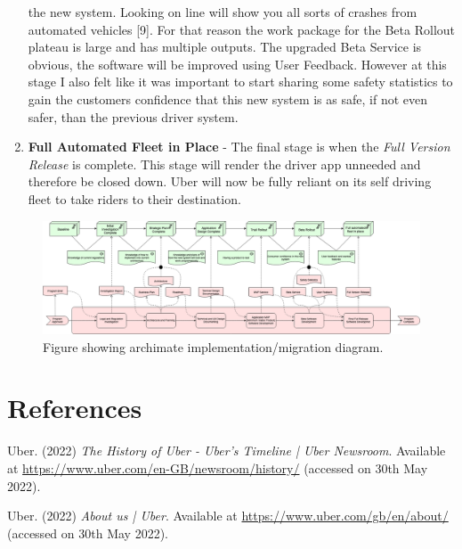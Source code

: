\documentclass{article}
\begin{document}
\begin{enumerate}
            the new system. Looking on line will show you all sorts of crashes from automated vehicles [9]. For that reason the work package for the Beta Rollout
            plateau is large and has multiple outputs. The upgraded Beta Service is obvious, the software will be improved using User Feedback. However at this 
            stage I also felt like it was important to start sharing some safety statistics to gain the customers confidence that this new system is as safe, if 
            not even safer, than the previous driver system.
      \item \textbf{Full Automated Fleet in Place} - The final stage is when the \textit{Full Version Release} is complete. This stage will render the driver app
            unneeded and therefore be closed down. Uber will now be fully reliant on its self driving fleet to take riders to their destination.
    \end{enumerate}

    \newpage

    \begin{landscape}
      \begin{figure}
        \centering
        \includegraphics[width=20cm]{assets/migration.drawio.png}
        \caption{Figure showing archimate implementation/migration diagram.}
        \label{fig:migrationDiagram}
      \end{figure}
    \end{landscape}

    \newpage
    \section{References}
    \noindent [1] Uber. (2022) \textit{The History of Uber - Uber's Timeline | Uber Newsroom}. Available at \url{https://www.uber.com/en-GB/newsroom/history/} (accessed on 30th May 2022).
    \vspace{0.2cm}

    \noindent [2] Uber. (2022) \textit{About us | Uber}. Available at \url{https://www.uber.com/gb/en/about/} (accessed on 30th May 2022).
    \vspace{0.2cm}
\end{document}
